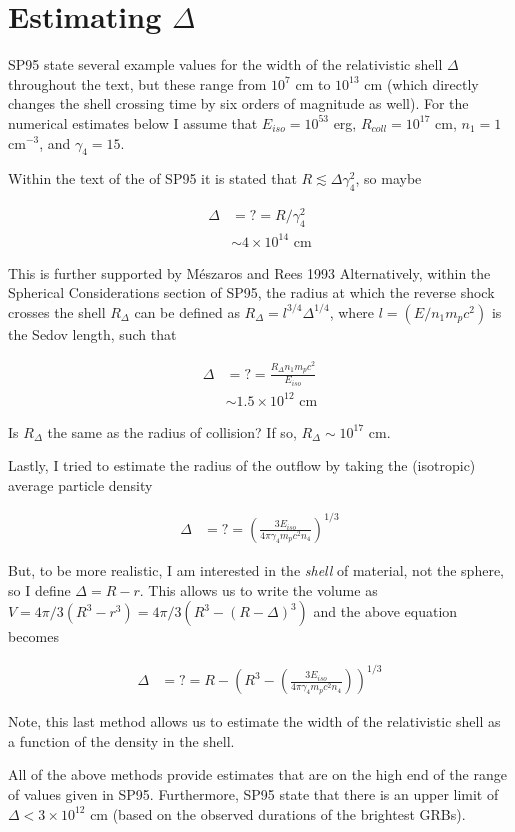 \documentclass[linenumbers,twocolumn]{aastex631}
\begin{document}
\section[Estimating The Width of The Relativistic Shell]{Estimating $\Delta$}
{
    SP95 state several example values for the width of the relativistic shell $\Delta$ throughout the text, but these range from $10^7$ cm to $10^{13}$ cm (which directly changes the shell crossing time by six orders of magnitude as well). For the numerical estimates below I assume that $E_{iso}=10^{53}$ erg, $R_{coll} = 10^{17}$ cm, $n_1 = 1$ cm$^{-3}$, and $\gamma_4 = 15$.

    Within the text of the of SP95 it is stated that $R \lesssim \Delta \gamma_4^2$, so maybe

    \begin{align}
        \Delta &=?= R / \gamma_4^2 \\
        &\sim4\times10^{14}\text{ cm} \nonumber
    \end{align}

    This is further supported by M\'eszaros and Rees 1993 Alternatively, within the Spherical Considerations section of SP95, the radius at which the reverse shock crosses the shell $R_{\Delta}$ can be defined as $R_{\Delta} = l^{3/4}\Delta^{1/4}$, where $l=(E/n_1 m_p c^2)$ is the Sedov length, such that

    \begin{align}
        \Delta &=?= \frac{R_{\Delta} n_1 m_p c^2}{E_{iso}} \\
        &\sim1.5\times10^{12}\text{ cm} \nonumber
    \end{align} 

    Is $R_{\Delta}$ the same as the radius of collision? If so, $R_{\Delta}\sim10^{17}$ cm.

    Lastly, I tried to estimate the radius of the outflow by taking the (isotropic) average particle density

    \begin{align}
        \Delta &=?= \left(\frac{3 E_{iso}}{4\pi \gamma_4 m_p c^2 n_4}\right)^{1/3}
    \end{align}

    But, to be more realistic, I am interested in the \textit{shell} of material, not the sphere, so I define $\Delta = R-r$. This allows us to write the volume as $V = 4\pi/3 (R^3- r^3) = 4\pi/3 (R^3- (R-\Delta)^3)$ and the above equation becomes 

    \begin{align}
        \Delta &=?= R - \left(R^3 - \left(\frac{3 E_{iso}}{4\pi \gamma_4 m_p c^2 n_4}\right)\right)^{1/3}
    \end{align}

    Note, this last method allows us to estimate the width of the relativistic shell as a function of the density in the shell. 

    All of the above methods provide estimates that are on the high end of the range of values given in SP95. Furthermore, SP95 state that there is an upper limit of $\Delta < 3\times 10^{12}$ cm (based on the observed durations of the brightest GRBs).
}
\end{document}
